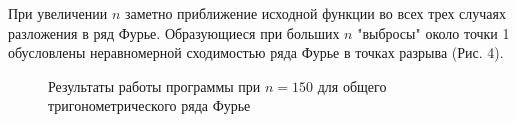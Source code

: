 \documentclass[a5paper, 10pt]{article}
\theoremstyle{definition}
\theoremstyle{plain}
\theoremstyle{remark}
\begin{document}
При увеличении $n$ заметно приближение исходной функции во всех трех случаях разложения в ряд Фурье. Образующиеся при больших $n$ "выбросы"  около точки 1 обусловлены неравномерной сходимостью ряда Фурье в точках разрыва (Рис. 4).


\begin{figure}[h]
	           \caption{Результаты работы программы при $n = 150$ для общего тригонометрического ряда Фурье}
		
\label{ris:5}
\end{figure}
\end{document}
